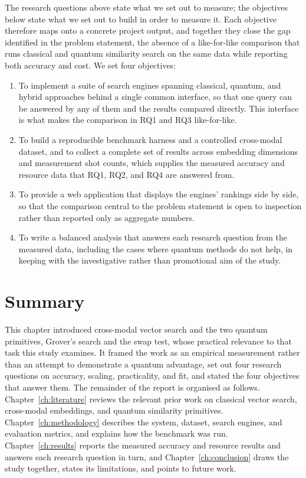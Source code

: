 The research questions above state what we set out to measure; the objectives
below state what we set out to build in order to measure it. Each objective
therefore maps onto a concrete project output, and together they close the gap
identified in the problem statement, the absence of a like-for-like comparison
that runs classical and quantum similarity search on the same data while
reporting both accuracy and cost. We set four objectives:

\begin{enumerate}[leftmargin=*]
  \item To implement a suite of search engines spanning classical, quantum, and
        hybrid approaches behind a single common interface, so that one query can
        be answered by any of them and the results compared directly. This
        interface is what makes the comparison in RQ1 and RQ3 like-for-like.
  \item To build a reproducible benchmark harness and a controlled cross-modal
        dataset, and to collect a complete set of results across embedding
        dimensions and measurement shot counts, which supplies the measured
        accuracy and resource data that RQ1, RQ2, and RQ4 are answered from.
  \item To provide a web application that displays the engines' rankings side by
        side, so that the comparison central to the problem statement is open to
        inspection rather than reported only as aggregate numbers.
  \item To write a balanced analysis that answers each research question from the
        measured data, including the cases where quantum methods do not help, in
        keeping with the investigative rather than promotional aim of the study.
\end{enumerate}

\section{Summary}
\label{sec:intro:summary}

This chapter introduced cross-modal vector search and the two quantum primitives,
Grover's search and the swap test, whose practical relevance to that task this
study examines. It framed the work as an empirical measurement rather than an
attempt to demonstrate a quantum advantage, set out four research questions on
accuracy, scaling, practicality, and fit, and stated the four objectives that
answer them. The remainder of the report is organised as follows.
Chapter~\ref{ch:literature} reviews the relevant prior work on classical vector
search, cross-modal embeddings, and quantum similarity primitives.
Chapter~\ref{ch:methodology} describes the system, dataset, search engines, and
evaluation metrics, and explains how the benchmark was run.
Chapter~\ref{ch:results} reports the measured accuracy and resource results and
answers each research question in turn, and Chapter~\ref{ch:conclusion} draws the
study together, states its limitations, and points to future work.
